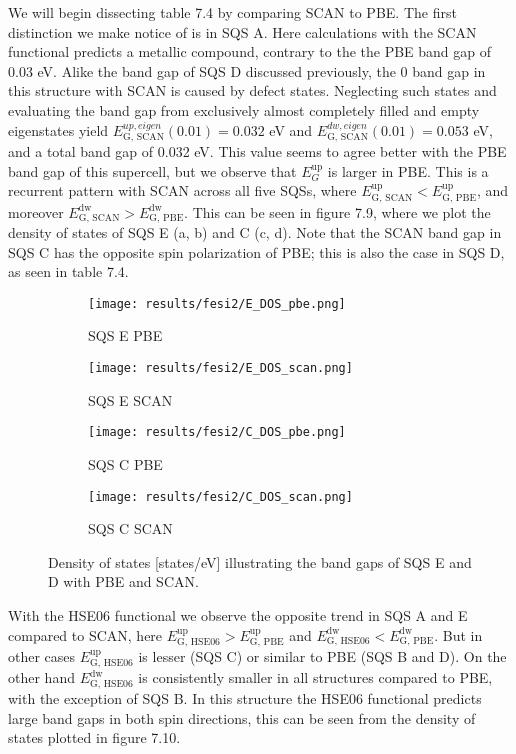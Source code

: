 We will begin dissecting table 7.4 by comparing SCAN to PBE. The first distinction we make notice of is in SQS A. Here calculations with the SCAN functional predicts a metallic compound, contrary to the the PBE band gap of 0.03 eV. Alike the band gap of SQS D discussed previously, the 0 band gap in this structure with SCAN is caused by defect states. Neglecting such states and evaluating the band gap from exclusively almost completely filled and empty eigenstates yield $E_\text{G, SCAN} ^{up, eigen}(0.01) = 0.032$ eV and $E_\text{G, SCAN} ^{dw, eigen}(0.01) = 0.053$ eV, and a total band gap of 0.032 eV. This value seems to agree better with the PBE band gap of this supercell, but we observe that $E_G ^\text{up}$ is larger in PBE.  This is a recurrent pattern with SCAN across all five SQSs, where $E_\text{G, SCAN} ^\text{up} < E_\text{G, PBE} ^\text{up}$, and moreover $E_\text{G, SCAN} ^\text{dw} > E_\text{G, PBE} ^\text{dw}$. This can be seen in figure 7.9, where we plot the density of states of SQS E (a, b) and C (c, d). Note that the SCAN band gap in SQS C has the opposite spin polarization of PBE; this is also the case in SQS D, as seen in table 7.4.
\begin{figure}[H]
	\begin{subfigure}{.5\textwidth}
		\texttt{[image: results/fesi2/E\_DOS\_pbe.png]}
		\caption{SQS E PBE}
	\end{subfigure}
	\begin{subfigure}{.5\textwidth}
		\texttt{[image: results/fesi2/E\_DOS\_scan.png]}
		\caption{SQS E SCAN}
	\end{subfigure}
	\begin{subfigure}{.5\textwidth}
		\texttt{[image: results/fesi2/C\_DOS\_pbe.png]}
		\caption{SQS C PBE}
	\end{subfigure}
	\begin{subfigure}{.5\textwidth}
		\texttt{[image: results/fesi2/C\_DOS\_scan.png]}
		\caption{SQS C SCAN}
	\end{subfigure}
	\caption{Density of states [states/eV] illustrating the band gaps of SQS E and D with PBE and SCAN.}
\end{figure}

With the HSE06 functional we observe the opposite trend in SQS A and E compared to SCAN, here $E_\text{G, HSE06} ^\text{up} > E_\text{G, PBE} ^\text{up}$ and $E_\text{G, HSE06} ^\text{dw} < E_\text{G, PBE} ^\text{dw}$. But in other cases $E_\text{G, HSE06} ^\text{up}$ is lesser (SQS C) or similar to PBE (SQS B and D). On the other hand $E_\text{G, HSE06} ^\text{dw}$ is consistently smaller in all structures compared to PBE, with the exception of SQS B. In this structure the HSE06 functional predicts large band gaps in both spin directions, this can be seen from the density of states plotted in figure 7.10.    
 
